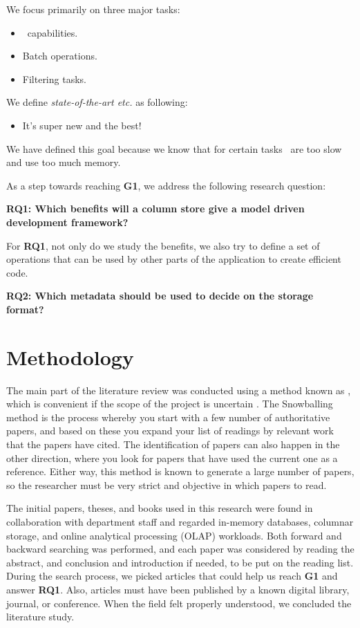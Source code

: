 We focus primarily on three major tasks:
\begin{itemize}
    \item \bd~capabilities.
    \item Batch operations.
    \item Filtering tasks.
\end{itemize}

We define \textit{state-of-the-art etc.} as following:
\begin{itemize}
    \item It's super new and the best!
\end{itemize}

We have defined this goal because we know that for certain tasks \genusSoftware~are too slow and use too much memory.

As a step towards reaching \textbf{G1}, we address the following research question:

\textbf{RQ1: Which benefits will a column store give a model driven development framework?} 

For \textbf{RQ1}, not only do we study the benefits, we also try to define a set of operations that can be used by other parts of the application to create efficient code.

\textbf{RQ2: Which metadata should be used to decide on the storage format?} 

\section{Methodology}
\label{sec:Methodology}
The main part of the literature review was conducted using a method known as , which is convenient if the scope of the project is uncertain \cite{Ang2014-nm}. The Snowballing method is the process whereby you start with a few number of authoritative papers, and based on these you expand your list of readings by relevant work that the papers have cited. The identification of papers can also happen in the other direction, where you look for papers that have used the current one as a reference. Either way, this method is known to generate a large number of papers, so the researcher must be very strict and objective in which papers to read.

The initial papers, theses, and books used in this research were found in collaboration with department staff and regarded in-memory databases, columnar storage, and online analytical processing (OLAP) workloads. Both forward and backward searching was performed, and each paper was considered by reading the abstract, and conclusion and introduction if needed, to be put on the reading list. During the search process, we picked articles that could help us reach \textbf{G1} and answer \textbf{RQ1}. Also, articles must have been published by a known digital library, journal, or conference. When the field felt properly understood, we concluded the  literature study.

